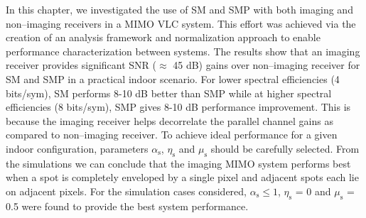 In this chapter, we investigated the use of SM and SMP with both imaging and non--imaging receivers in a MIMO VLC system. This effort was achieved via the creation of an analysis framework and normalization approach to enable performance characterization between systems. The results show that an imaging receiver provides significant SNR ($\approx$ 45 dB) gains over non--imaging receiver for SM and SMP in a practical indoor scenario. For lower spectral efficiencies (4 bits/sym), SM performs 8-10 dB better than SMP while at higher spectral efficiencies (8 bits/sym), SMP gives 8-10 dB performance improvement. This is because the imaging receiver helps decorrelate the parallel channel gains as compared to non--imaging receiver. To achieve ideal performance for a given indoor configuration, parameters $\alpha_{\text{s}}$, $\eta_{\text{s}}$ and $\mu_{\text{s}}$ should be carefully selected. From the simulations we can conclude that the imaging MIMO system performs best when a spot is completely enveloped by a single pixel and adjacent spots each lie on adjacent pixels. For the simulation cases considered, $\alpha_{\text{s}}\leq 1$, $\eta_{\text{s}}$ = 0 and $\mu_{\text{s}}$ = 0.5 were found to provide the best system performance.
